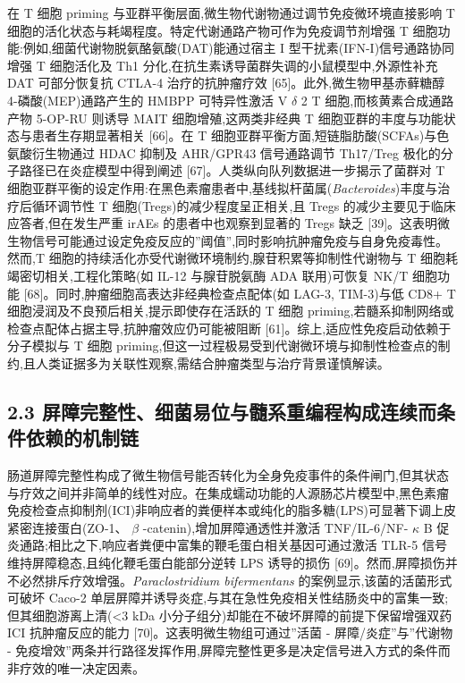 在 T 细胞 priming 与亚群平衡层面,微生物代谢物通过调节免疫微环境直接影响 T 细胞的活化状态与耗竭程度。特定代谢通路产物可作为免疫调节剂增强 T 细胞功能:例如,细菌代谢物脱氨酪氨酸(DAT)能通过宿主 I 型干扰素(IFN-I)信号通路协同增强 T 细胞活化及 Th1 分化,在抗生素诱导菌群失调的小鼠模型中,外源性补充 DAT 可部分恢复抗 CTLA-4 治疗的抗肿瘤疗效 {[}65{]}。此外,微生物甲基赤藓糖醇 4-磷酸(MEP)通路产生的 HMBPP 可特异性激活 V \(\delta\) 2 T 细胞,而核黄素合成通路产物 5-OP-RU 则诱导 MAIT 细胞增殖,这两类非经典 T 细胞亚群的丰度与功能状态与患者生存期显著相关 {[}66{]}。在 T 细胞亚群平衡方面,短链脂肪酸(SCFAs)与色氨酸衍生物通过 HDAC 抑制及 AHR/GPR43 信号通路调节 Th17/Treg 极化的分子路径已在炎症模型中得到阐述 {[}67{]}。人类纵向队列数据进一步揭示了菌群对 T 细胞亚群平衡的设定作用:在黑色素瘤患者中,基线拟杆菌属(\emph{Bacteroides})丰度与治疗后循环调节性 T 细胞(Tregs)的减少程度呈正相关,且 Tregs 的减少主要见于临床应答者,但在发生严重 irAEs 的患者中也观察到显著的 Tregs 缺乏 {[}39{]}。这表明微生物信号可能通过设定免疫反应的''阈值'',同时影响抗肿瘤免疫与自身免疫毒性。然而,T 细胞的持续活化亦受代谢微环境制约,腺苷积累等抑制性代谢物与 T 细胞耗竭密切相关,工程化策略(如 IL-12 与腺苷脱氨酶 ADA 联用)可恢复 NK/T 细胞功能 {[}68{]}。同时,肿瘤细胞高表达非经典检查点配体(如 LAG-3, TIM-3)与低 CD8+ T 细胞浸润及不良预后相关,提示即使存在活跃的 T 细胞 priming,若髓系抑制网络或检查点配体占据主导,抗肿瘤效应仍可能被阻断 {[}61{]}。综上,适应性免疫启动依赖于分子模拟与 T 细胞 priming,但这一过程极易受到代谢微环境与抑制性检查点的制约,且人类证据多为关联性观察,需结合肿瘤类型与治疗背景谨慎解读。

\subsection{2.3 屏障完整性、细菌易位与髓系重编程构成连续而条件依赖的机制链}\label{ux5c4fux969cux5b8cux6574ux6027ux7ec6ux83ccux6613ux4f4dux4e0eux9ad3ux7cfbux91cdux7f16ux7a0bux6784ux6210ux8fdeux7eedux800cux6761ux4ef6ux4f9dux8d56ux7684ux673aux5236ux94fe}

肠道屏障完整性构成了微生物信号能否转化为全身免疫事件的条件闸门,但其状态与疗效之间并非简单的线性对应。在集成蠕动功能的人源肠芯片模型中,黑色素瘤免疫检查点抑制剂(ICI)非响应者的粪便样本或纯化的脂多糖(LPS)可显著下调上皮紧密连接蛋白(ZO-1、 \(\beta\) -catenin),增加屏障通透性并激活 TNF/IL-6/NF- \(\kappa\) B 促炎通路;相比之下,响应者粪便中富集的鞭毛蛋白相关基因可通过激活 TLR-5 信号维持屏障稳态,且纯化鞭毛蛋白能部分逆转 LPS 诱导的损伤 {[}69{]}。然而,屏障损伤并不必然排斥疗效增强。\emph{Paraclostridium bifermentans} 的案例显示,该菌的活菌形式可破坏 Caco-2 单层屏障并诱导炎症,与其在急性免疫相关性结肠炎中的富集一致;但其细胞游离上清(\textless3 kDa 小分子组分)却能在不破坏屏障的前提下保留增强双药 ICI 抗肿瘤反应的能力 {[}70{]}。这表明微生物组可通过''活菌 - 屏障/炎症''与''代谢物 - 免疫增效''两条并行路径发挥作用,屏障完整性更多是决定信号进入方式的条件而非疗效的唯一决定因素。

